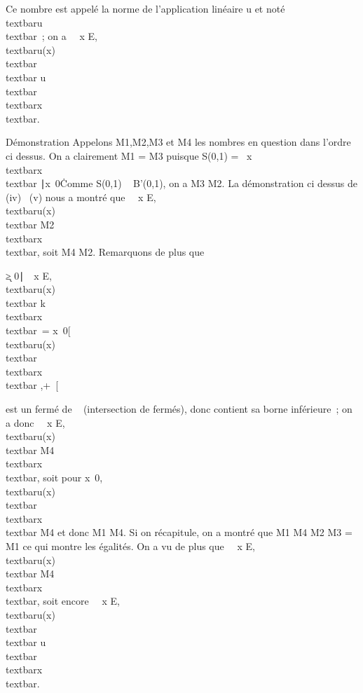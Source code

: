 Ce nombre est appelé la norme de l'application linéaire u et noté
\\textbar{}u\\textbar{}~; on a
\forall~~x \in E,
\\textbar{}u(x)\\textbar{}
\leq\\textbar{}
u\\textbar{}\,\\textbar{}x\\textbar{}.

Démonstration Appelons M1,M2,M3 et
M4 les nombres en question dans l'ordre ci dessus. On a
clairement M1 = M3 puisque S(0,1) =
\ x \over
\\textbar{}x\\textbar{}
∣x\mathrel\neq~0\.
Comme S(0,1) \subset~ B'(0,1), on a M3 \leq M2. La
démonstration ci dessus de (iv) \rigtharrow~(v) nous a montré que
\forall~~x \in E,
\\textbar{}u(x)\\textbar{} \leq
M2\\textbar{}x\\textbar{}, soit
M4 \leq M2. Remarquons de plus que

\k ≥
0∣\forall~~x \in E,
\\textbar{}u(x)\\textbar{} \leq
k\\textbar{}x\\textbar{}\
= \⋂
x\neq~0{[}
\\textbar{}u(x)\\textbar{}
\over
\\textbar{}x\\textbar{} ,+\infty~{[}

est un fermé de ~ (intersection de fermés), donc contient sa borne
inférieure~; on a donc \forall~~x \in E,
\\textbar{}u(x)\\textbar{} \leq
M4\\textbar{}x\\textbar{}, soit
pour x\neq~0, 
\\textbar{}u(x)\\textbar{}
\over
\\textbar{}x\\textbar{} \leq M4
et donc M1 \leq M4. Si on récapitule, on a montré que
M1 \leq M4 \leq M2 \leq M3 = M1
ce qui montre les égalités. On a vu de plus que
\forall~~x \in E,
\\textbar{}u(x)\\textbar{} \leq
M4\\textbar{}x\\textbar{}, soit
encore \forall~~x \in E,
\\textbar{}u(x)\\textbar{}
\leq\\textbar{}
u\\textbar{}\,\\textbar{}x\\textbar{}.

